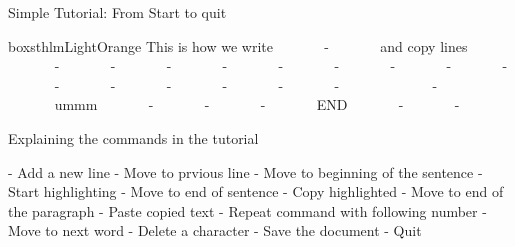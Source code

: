 \documentclass[newPxFont,sthlmFooter,nooffset]{beamer}
\begin{document}
\begin{frame}[containsverbatim,t]{Simple Tutorial: From Start to quit}
\begin{beamercolorbox}[sep=1em,wd=\linewidth]{boxsthlmLightOrange}
{\footnotesize
This is how we write \hfill ~~~~~~ - \hfill~~~~~~  and copy lines \hfill ~~~~~~ - \hfill~~~~~~  -  \hfill~~~~~~   - \hfill~~~~~~    - \hfill~~~~~~    - \hfill~~~~~~    -\keystroke{\}} \hfill~~~~~~    - \hfill~~~~~~    - \hfill~~~~~~    - \hfill~~~~~~    - \hfill~~~~~~    - \hfill~~~~~~   -  \hfill~~~~~~   - \hfill ~~~~~~   -  \hfill~~~~~~   -\keystroke{\}}\hfill~~~~~~    \hfill~~~~~~    - \hfill~~~~~~     \hfill~~~~~~   ummm \hfill~~~~~~   - \hfill~~~~~~    - \hfill~~~~~~    - ~~~~~~   END ~~~~~~   - ~~~~~~ - }
\end{beamercolorbox}

\bigskip
Explaining the commands in the tutorial

\bigskip
{\footnotesize
{}- Add a new line \hfill
{}- Move to prvious line \hfill
{}- Move to beginning of the sentence \hfill
{}- Start highlighting \hfill
{}- Move to end of sentence \hfill
{}- Copy highlighted \hfill
{}-\keystroke{\}} Move to end of the paragraph \hfill
{}- Paste copied text \hfill
{}- Repeat command with following number \hfill
{}- Move to next word \hfill
{}- Delete a character \hfill
{}- Save the document 
- Quit 
}
\end{frame}
\end{document}
